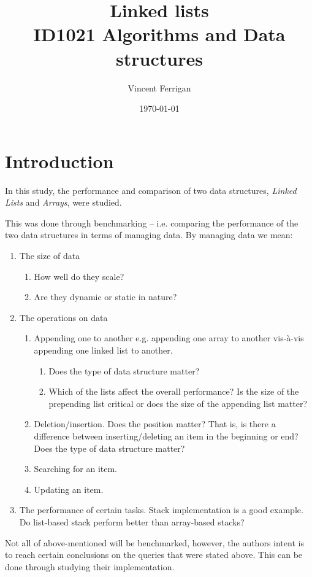 \documentclass[a4paper, 11pt]{article}
\title{Linked lists\\ \small{ID1021 Algorithms and Data structures}} %
\author{Vincent Ferrigan}
\date{\today}
\begin{document}
    \maketitle
    \section*{Introduction}
    In this study, the performance and comparison of two data structures,
    \emph{Linked Lists} and \emph{Arrays}, were studied. 
    
    This was done through benchmarking -- i.e. comparing the performance of
    the two data structures in terms of managing data. 
    By managing data we mean:
    
    \begin{enumerate}[label*=\arabic*.]
        \item The size of data
        \begin{enumerate}[label*=\arabic*.]
            \item How well do they scale?
            \item Are they dynamic or static in nature? 
        \end{enumerate}
        \item The operations on data
        \begin{enumerate}[label*=\arabic*.]
            \item Appending one to another e.g. appending one array to another
            vis-à-vis appending one linked list to another. 
            \begin{enumerate}[label*=\arabic*.]
                \item Does the type of data structure matter?
                \item Which of the lists affect the overall performance?
                Is the size of the prepending list critical or does the size of
                the appending list matter?
            \end{enumerate}
            \item Deletion/insertion. Does the position matter? That is, is
            there a difference between inserting/deleting an item in the
            beginning or end? Does the type of data structure matter?
            \item Searching for an item.
            \item Updating an item. 
        \end{enumerate}
        \item The performance of certain tasks. 
        Stack implementation is a good example. 
        Do list-based stack perform better than array-based stacks?
    \end{enumerate}
    Not all of above-mentioned will be benchmarked, however, the authors intent is to
    reach certain conclusions on the queries that were stated above. 
    This can be done through studying their implementation. 
            
\end{document}

